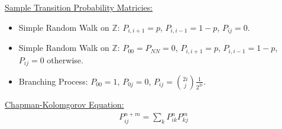 \documentclass{article}
\newcommand{\sheader}[1]{\underline{#1:}}
\begin{document}
\pagebreak 

\sheader{Sample Transition Probability Matricies}
\begin{itemize}
    \item Simple Random Walk on $\mathbb{Z}$: $P_{i, i+1} = p$, 
    $P_{i, i-1} = 1-p$, $P_{ij} = 0$.
    \item Simple Random Walk on $\mathbb{Z}$: $P_{00} = P_{NN} = 0$, $P_{i, i+1} = p$, 
    $P_{i, i-1} = 1-p$, $P_{ij} = 0$ otherwise.
    \item Branching Process: $P_{00} = 1$, $P_{0j}= 0$, $P_{ij} = \binom{2i}{j}\frac{1}{2^{2i}}$.
\end{itemize}

\sheader{Chapman-Kolomgorov Equation}
\begin{align*}
    P_{ij}^{n+m} = \sum_{k}P_{ik}^nP_{kj}^m
\end{align*}
\end{document}
